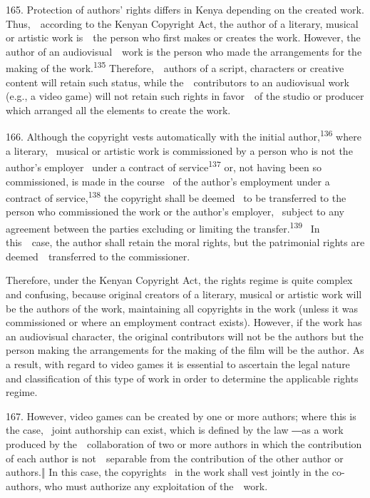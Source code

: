 \documentclass[
]{article}
\begin{document}
{165. }{Protecti}{on of authors' rights differs in Kenya depending on
the created work}{. Thus,~~according to the Kenyan }{Copyright Act}{,
the }{author }{of a literary, musical or artistic work is~~the person
who first makes or creates the work. However, the }{author }{of an
audiovisual~~work is the person who made the arrangements for the making
of the work.}\textsuperscript{{135 }}{Therefore,~~authors of a script,
characters or creative content will retain such status, while
the~~contributors to an audiovisual work (e.g., a video game) will not
retain such rights in favor~~of the studio or producer which arranged
all the elements to create the work.}

{166. }{Although the copyright vests automatically with the initial
author,}\textsuperscript{{136 }}{where a literary, }{~musical or
artistic work is commissioned by a person who is not the author's
employer }{~under a contract of service}\textsuperscript{{137 }}{or, not
having been so commissioned, is made in the course }{~of the author's
employment under a contract of service,}\textsuperscript{{138 }}{the
copyright shall be deemed }{~to be transferred to the person who
commissioned the work or the author's employer, }{~subject to any
agreement between the parties excluding or limiting the
transfer.}\textsuperscript{{139~~}}{In this~~case, the author shall
retain the moral rights, but the patrimonial rights are
deemed~~transferred to the commissioner.}

{Therefore, under the Kenyan }{Copyright Act}{, the rights regime is
quite complex and confusing, because original creators of a literary,
musical or artistic work will be the }{authors }{of the work,
maintaining all copyrights in the work (unless it was commissioned or
where an employment contract exists). However, if the work has an
audiovisual character, the original contributors will not be the
}{authors }{but the person making the arrangements for the making of the
film will be the author. As a result, with regard to video games it is
essential to ascertain the legal nature and classification of this type
of work in order to determine the applicable rights regime.}

{167. }{However, video games can be created by one or more authors;
where this is the case, }{~joint authorship can exist, which is defined
by the law ―}{as a work produced by the~~collaboration of two or more
authors in which the contribution of each author is not~~separable from
the contribution of the other author or authors}{.‖ In this case, the
copyrights }{~in the work shall vest jointly in the co-authors, who must
authorize any exploitation of the~~work.}
\end{document}
